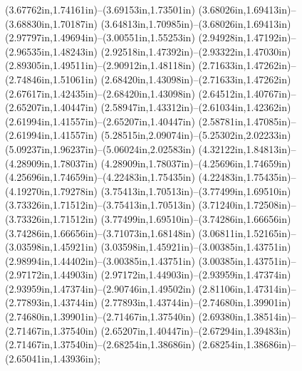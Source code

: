 (3.67762in,1.74161in)--(3.69153in,1.73501in) (3.68026in,1.69413in)--(3.68830in,1.70187in) (3.64813in,1.70985in)--(3.68026in,1.69413in) (2.97797in,1.49694in)--(3.00551in,1.55253in) (2.94928in,1.47192in)--(2.96535in,1.48243in) (2.92518in,1.47392in)--(2.93322in,1.47030in) (2.89305in,1.49511in)--(2.90912in,1.48118in) (2.71633in,1.47262in)--(2.74846in,1.51061in) (2.68420in,1.43098in)--(2.71633in,1.47262in) (2.67617in,1.42435in)--(2.68420in,1.43098in) (2.64512in,1.40767in)--(2.65207in,1.40447in) (2.58947in,1.43312in)--(2.61034in,1.42362in) (2.61994in,1.41557in)--(2.65207in,1.40447in) (2.58781in,1.47085in)--(2.61994in,1.41557in) (5.28515in,2.09074in)--(5.25302in,2.02233in) (5.09237in,1.96237in)--(5.06024in,2.02583in) (4.32122in,1.84813in)--(4.28909in,1.78037in) (4.28909in,1.78037in)--(4.25696in,1.74659in) (4.25696in,1.74659in)--(4.22483in,1.75435in) (4.22483in,1.75435in)--(4.19270in,1.79278in) (3.75413in,1.70513in)--(3.77499in,1.69510in) (3.73326in,1.71512in)--(3.75413in,1.70513in) (3.71240in,1.72508in)--(3.73326in,1.71512in) (3.77499in,1.69510in)--(3.74286in,1.66656in) (3.74286in,1.66656in)--(3.71073in,1.68148in) (3.06811in,1.52165in)--(3.03598in,1.45921in) (3.03598in,1.45921in)--(3.00385in,1.43751in) (2.98994in,1.44402in)--(3.00385in,1.43751in) (3.00385in,1.43751in)--(2.97172in,1.44903in) (2.97172in,1.44903in)--(2.93959in,1.47374in) (2.93959in,1.47374in)--(2.90746in,1.49502in) (2.81106in,1.47314in)--(2.77893in,1.43744in) (2.77893in,1.43744in)--(2.74680in,1.39901in) (2.74680in,1.39901in)--(2.71467in,1.37540in) (2.69380in,1.38514in)--(2.71467in,1.37540in) (2.65207in,1.40447in)--(2.67294in,1.39483in) (2.71467in,1.37540in)--(2.68254in,1.38686in) (2.68254in,1.38686in)--(2.65041in,1.43936in);
